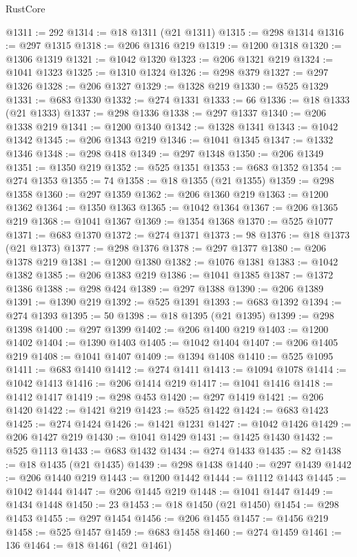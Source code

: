 \begin{lexlean}{RustCore}
\begin{coremodule}
@1311 := 292
@1314 := @18 @1311 (@21 @1311)
@1315 := @298 @1314
@1316 := @297 @1315
@1318 := @206 @1316 @219
@1319 := @1200 @1318
@1320 := @1306 @1319
@1321 := @1042 @1320
@1323 := @206 @1321 @219
@1324 := @1041 @1323
@1325 := @1310 @1324
@1326 := @298 @379
@1327 := @297 @1326
@1328 := @206 @1327
@1329 := @1328 @219
@1330 := @525 @1329
@1331 := @683 @1330
@1332 := @274 @1331
@1333 := 66
@1336 := @18 @1333 (@21 @1333)
@1337 := @298 @1336
@1338 := @297 @1337
@1340 := @206 @1338 @219
@1341 := @1200 @1340
@1342 := @1328 @1341
@1343 := @1042 @1342
@1345 := @206 @1343 @219
@1346 := @1041 @1345
@1347 := @1332 @1346
@1348 := @298 @418
@1349 := @297 @1348
@1350 := @206 @1349
@1351 := @1350 @219
@1352 := @525 @1351
@1353 := @683 @1352
@1354 := @274 @1353
@1355 := 74
@1358 := @18 @1355 (@21 @1355)
@1359 := @298 @1358
@1360 := @297 @1359
@1362 := @206 @1360 @219
@1363 := @1200 @1362
@1364 := @1350 @1363
@1365 := @1042 @1364
@1367 := @206 @1365 @219
@1368 := @1041 @1367
@1369 := @1354 @1368
@1370 := @525 @1077
@1371 := @683 @1370
@1372 := @274 @1371
@1373 := 98
@1376 := @18 @1373 (@21 @1373)
@1377 := @298 @1376
@1378 := @297 @1377
@1380 := @206 @1378 @219
@1381 := @1200 @1380
@1382 := @1076 @1381
@1383 := @1042 @1382
@1385 := @206 @1383 @219
@1386 := @1041 @1385
@1387 := @1372 @1386
@1388 := @298 @424
@1389 := @297 @1388
@1390 := @206 @1389
@1391 := @1390 @219
@1392 := @525 @1391
@1393 := @683 @1392
@1394 := @274 @1393
@1395 := 50
@1398 := @18 @1395 (@21 @1395)
@1399 := @298 @1398
@1400 := @297 @1399
@1402 := @206 @1400 @219
@1403 := @1200 @1402
@1404 := @1390 @1403
@1405 := @1042 @1404
@1407 := @206 @1405 @219
@1408 := @1041 @1407
@1409 := @1394 @1408
@1410 := @525 @1095
@1411 := @683 @1410
@1412 := @274 @1411
@1413 := @1094 @1078
@1414 := @1042 @1413
@1416 := @206 @1414 @219
@1417 := @1041 @1416
@1418 := @1412 @1417
@1419 := @298 @453
@1420 := @297 @1419
@1421 := @206 @1420
@1422 := @1421 @219
@1423 := @525 @1422
@1424 := @683 @1423
@1425 := @274 @1424
@1426 := @1421 @1231
@1427 := @1042 @1426
@1429 := @206 @1427 @219
@1430 := @1041 @1429
@1431 := @1425 @1430
@1432 := @525 @1113
@1433 := @683 @1432
@1434 := @274 @1433
@1435 := 82
@1438 := @18 @1435 (@21 @1435)
@1439 := @298 @1438
@1440 := @297 @1439
@1442 := @206 @1440 @219
@1443 := @1200 @1442
@1444 := @1112 @1443
@1445 := @1042 @1444
@1447 := @206 @1445 @219
@1448 := @1041 @1447
@1449 := @1434 @1448
@1450 := 23
@1453 := @18 @1450 (@21 @1450)
@1454 := @298 @1453
@1455 := @297 @1454
@1456 := @206 @1455
@1457 := @1456 @219
@1458 := @525 @1457
@1459 := @683 @1458
@1460 := @274 @1459
@1461 := 136
@1464 := @18 @1461 (@21 @1461)

\end{coremodule}
\end{lexlean}
